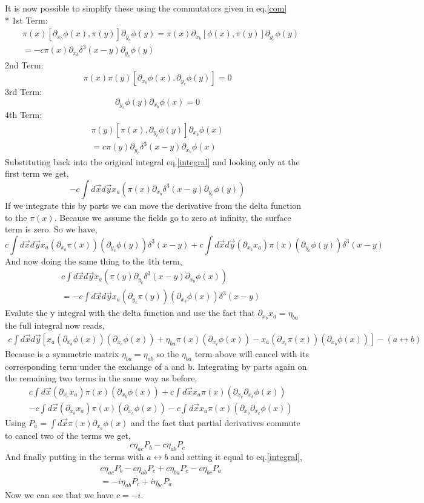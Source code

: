 \documentclass{article}
\numberwithin{equation}{section}
\newcommand{\dxa}{\partial_{x_a}}
\newcommand{\dxb}{\partial_{x_b}}
\newcommand{\dxc}{\partial_{x_c}}
\newcommand{\dyc}{\partial_{y_c}}
\newcommand{\ddf}{\delta^3(x-y)}
\newcommand{\intdd}{\int d\vec{x} d\vec{y}}
\newcommand{\beq}{\begin{equation}}
\newcommand{\eeq}{\end{equation}}
\begin{document}
It is now possible to simplify these using the commutators given in eq.\ref{com} \\*
1st Term:
\beq \begin{split}
    &\pi(x)[\dxb\phi(x),\pi(y)]\dyc\phi(y) = \pi(x) \dxb[\phi(x),\pi(y)]\dyc\phi(y)\\
    &=-c\pi(x)\dxb\ddf\dyc\phi(y)
\end{split}
\eeq 
2nd Term:
\beq 
    \pi(x)\pi(y)[\dxb\phi(x),\dyc\phi(y)] = 0
\eeq
3rd Term:
\beq
    [\pi(x),\pi(y)]\dyc\phi(y) \dxb\phi(x) = 0
\eeq
4th Term:
\beq \begin{split}
    \pi(y)[\pi(x),\dyc\phi(y)]\dxb\phi(x) \\
    = c\pi(y)\dyc\ddf\dxb\phi(x)
\end{split} \eeq
Substituting back into the original integral eq.\ref{integral} and looking only at the first term we get,
\beq
    -c \intdd x_a(\pi(x) \dxb\ddf\dyc\phi(y))
\eeq
If we integrate this by parts we can move the derivative from the delta function to the $\pi(x)$. Because we assume
the fields go to zero at infinity, the surface term is zero. So we have,
\beq
    c \intdd x_a (\dxb \pi(x))(\dyc \phi(y))\ddf + c\intdd (\dxb x_a)\pi(x)(\dyc\phi(y))\ddf
\eeq
And now doing the same thing to the 4th term,
\beq \begin{split}
    &c \intdd x_a (\pi(y) \dyc\ddf \dxb \phi(x))\\
    &= -c\intdd x_a (\dyc \pi(y))(\dxb \phi(x))\ddf
\end{split} \eeq
Evalute the y integral with the delta function and use the fact that $\dxb x_a = \eta_{ba}$ the full integral now reads,
\beq \begin{split}
    c\intdd [x_a (\dxb\phi(x))(\dxc\phi(x))+\eta_{ba} \pi(x)(\dxc\phi(x))-x_a(\dxc \pi(x))(\dxb\phi(x))] - (a \leftrightarrow b)
\end{split} \eeq
Because is a symmetric matrix $\eta_{ba} = \eta_{ab}$ so the $\eta_{ba}$ term above will cancel with its corresponding term under the exchange of a and b. 
Integrating by parts again on the remaining two terms in the same way as before,
\beq \begin{split}
    &c \int d\vec{x} (\dxc x_a) \pi(x)(\dxb\phi(x)) + c \int d\vec{x} x_a \pi(x)(\dxc \dxb \phi(x)) \\
    &-c \int d\vec{x}(\dxb x_a) \pi(x)(\dxc\phi(x)) - c \int d\vec{x} x_a \pi(x)(\dxb \dxc \phi(x))
\end{split} \eeq
Using $P_a=\int d\vec{x} \pi(x) \dxa \phi(x)$ and the fact that partial derivatives commute to cancel two of the terms we get,
\beq
    c \eta_{ac}P_b - c\eta_{ab}P_c
\eeq
And finally putting in the terms with $a \leftrightarrow b$ and setting it equal to eq.\ref{integral},
\beq \begin{split}
    &c \eta_{ac}P_b - c\eta_{ab}P_c + c\eta_{ba}P_c - c\eta_{bc}P_a \\
    & = - i\eta_{ab}P_c + i\eta_{bc}P_a
\end{split}
\eeq
Now we can see that we have $c=-i$.
\end{document}
